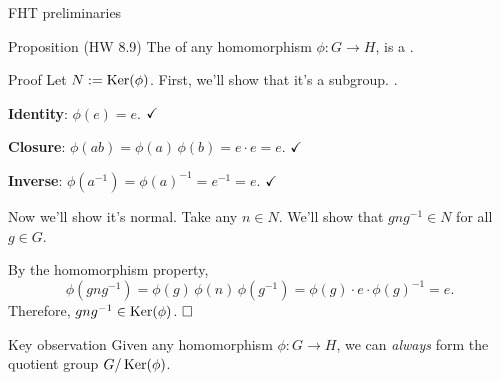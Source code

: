 \documentclass[8pt, handout]{beamer}
\newcommand{\Pause}{}      %
\begin{document}

\begin{frame}{FHT preliminaries}
  
  \begin{block}{Proposition (HW 8.9)}
    The  of any homomorphism $\phi\colon G\to
    H$, is a .
  \end{block}
  
  \begin{exampleblock}{Proof} \Pause
    Let $N:=\operatorname{Ker}(\phi)$. First, we'll show that it's a
    subgroup. \Pause {}. \medskip\pause
    
    \textbf{Identity}: $\phi(e)=e$. $\hfill\checkmark$
    
    \medskip\pause
    
    \textbf{Closure}:
    $\phi(ab)\Pause=\phi(a)\,\phi(b)\Pause=e\cdot e=e$. $\hfill\checkmark$
    
    \medskip\pause
    
    \textbf{Inverse}:
    $\phi(a^{-1})\Pause=\phi(a)^{-1}\Pause=e^{-1}\Pause=e$. 
    $\hfill\checkmark$ \medskip\pause
    
    Now we'll show it's normal. \Pause Take any $n\in N$. We'll show that
    $gng^{-1}\in N$ for all $g\in G$. \medskip\pause
    
    By the homomorphism property,
    \[
    \phi(gng^{-1})\Pause=\phi(g)\,\phi(n)\,\phi(g^{-1})
    \Pause=\phi(g)\cdot e\cdot\phi(g)^{-1}\Pause=e.
    \]
    \Pause Therefore, $gng^{-1}\in\operatorname{Ker}(\phi)$. $\hfill\Box$
  \end{exampleblock}
  
  \Pause
  
  \begin{alertblock}{Key observation}
    Given any homomorphism $\phi\colon G\to H$, we can \emph{always}
    form the quotient group $G/\operatorname{Ker}(\phi)$.
  \end{alertblock}
  
\end{frame}

\end{document}
